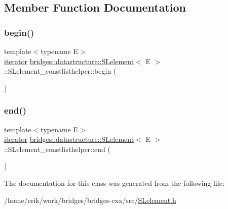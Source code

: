 \subsection{Member Function Documentation}
\mbox{\label{classbridges_1_1datastructure_1_1_s_lelement_1_1_s_lelement__constlisthelper_a2e2adc3b30f68514a90af399f47624ac}} 
\subsubsection{\texorpdfstring{begin()}{begin()}}
{\footnotesize\ttfamily template$<$typename E$>$ \\
\hyperlink{classbridges_1_1datastructure_1_1_s_lelement_1_1_s_lelement__constlisthelper_1_1iterator}{iterator} \hyperlink{classbridges_1_1datastructure_1_1_s_lelement}{bridges\+::datastructure\+::\+S\+Lelement}$<$ E $>$\+::S\+Lelement\+\_\+constlisthelper\+::begin (\begin{DoxyParamCaption}{ }\end{DoxyParamCaption})\hspace{0.3cm}{\ttfamily [inline]}}

\mbox{\label{classbridges_1_1datastructure_1_1_s_lelement_1_1_s_lelement__constlisthelper_a4ec5e5fe4b53638dfada78d44c7dd5b2}} 
\subsubsection{\texorpdfstring{end()}{end()}}
{\footnotesize\ttfamily template$<$typename E$>$ \\
\hyperlink{classbridges_1_1datastructure_1_1_s_lelement_1_1_s_lelement__constlisthelper_1_1iterator}{iterator} \hyperlink{classbridges_1_1datastructure_1_1_s_lelement}{bridges\+::datastructure\+::\+S\+Lelement}$<$ E $>$\+::S\+Lelement\+\_\+constlisthelper\+::end (\begin{DoxyParamCaption}{ }\end{DoxyParamCaption})\hspace{0.3cm}{\ttfamily [inline]}}



The documentation for this class was generated from the following file\+:\begin{DoxyCompactItemize}
\item 
/home/erik/work/bridges/bridges-\/cxx/src/\hyperlink{_s_lelement_8h}{S\+Lelement.\+h}\end{DoxyCompactItemize}

